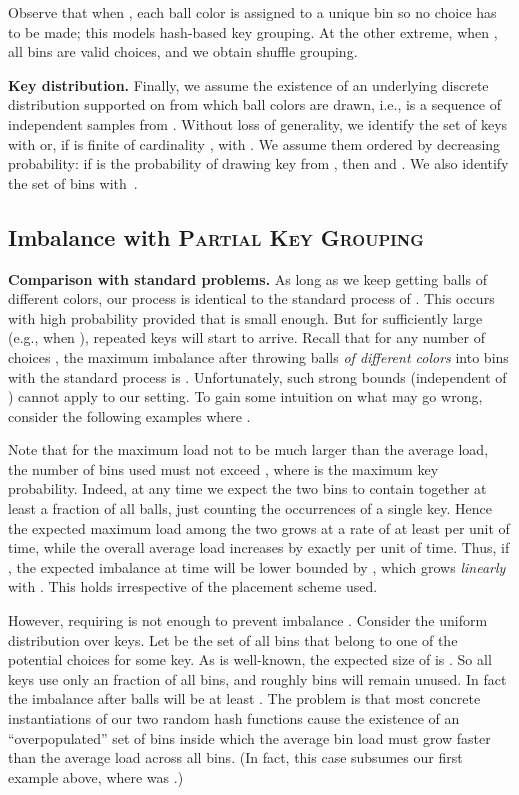 \documentclass[10pt,conference,letterpaper]{IEEEtran}
\newcommand{\spara}[1]{\smallskip\noindent\textbf{#1}}
\newcommand{\pkg}{\textsc{Partial Key Grouping}\xspace}
\begin{document}
Observe that when ,
each ball color is assigned to a unique bin so no choice has to be made; this models hash-based key grouping.
At the other extreme, when , all   bins are valid choices, and we obtain shuffle
grouping.

\spara{Key distribution.}
Finally, we assume the existence of an underlying discrete distribution  supported on  from which ball colors
are drawn, i.e.,  is a sequence of  independent samples from . 
Without loss of generality, we identify the set  of keys with
 or, if  is finite of cardinality , with .
We assume them ordered by decreasing probability: if  is the probability of drawing key  from , then
 and . We also identify the set  of bins with~.


\subsection{Imbalance with \pkg}

\spara{Comparison with standard problems.}
As long as we keep getting balls of different colors, our process is identical to the standard  process of \citet{azar1999balanced-allocations}.
This occurs with high probability provided that  is small enough.
But for sufficiently large  (e.g., when ), repeated keys will start to arrive.
Recall that for any number of choices , the maximum imbalance after throwing  balls \emph{of different colors} into  bins with the standard  process is . Unfortunately, such strong bounds (independent of ) cannot apply to our setting.
To gain some intuition on what may go wrong, consider the following examples where .

Note that for the maximum load not to be much larger than the average load, the number of bins used must not exceed , where  is the maximum key probability.
Indeed, at any time we expect
the two bins  to contain together at
least a  fraction of all balls, just counting the occurrences of a single key. Hence the expected maximum load among the two grows at a rate
of at least  per unit of
time, while the overall average load increases by exactly  per unit of time. Thus, if , the expected imbalance at time  will be lower bounded by
, which grows \emph{linearly} with . This holds irrespective of the placement scheme used.




However, requiring  is not enough to prevent imbalance . Consider the uniform distribution
over  keys. Let  be the set of all bins that belong to one of the potential choices for some key. 
As is well-known, the expected size of  is . So all  keys use only an  fraction of all
bins, and roughly  bins will remain unused. In fact the imbalance after  balls
will be at least .
The problem is that most concrete instantiations of our two random hash functions cause the existence of
an ``overpopulated'' set  of bins inside which
the average bin load must grow faster than the average load across all bins.
(In fact, this case subsumes our first example above, where  was .)
\end{document}
